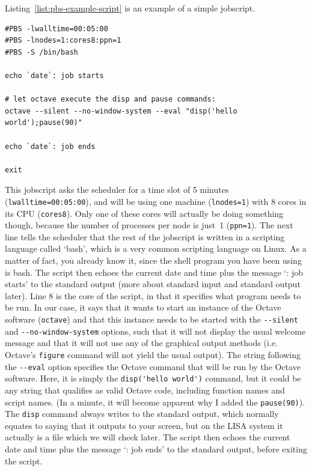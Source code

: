 Listing~\ref{list:pbs-example-script} is an example of a simple jobscript.


\begin{lstlisting}[style=basic,style=bash,style=numbered,caption={Example of a jobscript.},label=list:pbs-example-script]
#PBS -lwalltime=00:05:00
#PBS -lnodes=1:cores8:ppn=1
#PBS -S /bin/bash

echo `date`: job starts

# let octave execute the disp and pause commands:
octave --silent --no-window-system --eval "disp('hello world');pause(90)"

echo `date`: job ends

exit
\end{lstlisting}

This jobscript asks the scheduler for a time slot of 5 minutes (\lstinline[style=bashinline]{lwalltime=00:05:00}), and will be using one machine (\lstinline[style=bashinline]{lnodes=1}) with 8 cores in its CPU (\lstinline[style=bashinline]{cores8}). Only one of these cores will actually be doing something though, because the number of processes per node is just~1 (\lstinline[style=bashinline]{ppn=1}). The next line tells the scheduler that the rest of the jobscript is written in a scripting language called `bash', which is a very common scripting language on Linux. As a matter of fact, you already know it, since the shell program you have been using is bash. The script then echoes the current date and time plus the message `: job starts' to the standard output (more about standard input and standard output later).  Line 8 is the core of the script, in that it specifies what program needs to be run. In our case, it says that it wants to start an instance of the Octave software (\lstinline[style=bashinline]{octave}) and that this instance needs to be started with the \lstinline[style=bashinline]{--silent} and \lstinline[style=bashinline]{--no-window-system} options, such that it will not display the usual welcome message and that it will not use any of the graphical output methods (i.e.\, Octave's \lstinline[style=bashinline]{figure} command will not yield the usual output). The string following the \lstinline[style=bashinline]{--eval} option specifies the Octave command that will be run by the Octave software. Here, it is simply the \lstinline[style=bashinline]{disp('hello world')} command, but it could be any string that qualifies as valid Octave code, including function names and script names. (In a minute, it will become apparent why I added  the \lstinline[style=bashinline]{pause(90)}). The \lstinline[style=bashinline]{disp} command always writes to the standard output, which normally equates to saying that it outputs to your screen, but on the LISA system it actually is a file which we will check later. The script then echoes the current date and time plus the message `: job ends' to the standard output, before exiting the script.

